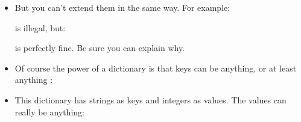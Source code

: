 \documentclass[letterpaper,10pt,english]{sphinxmanual}
\begin{document}
\begin{itemize}
\item {} 
But you can’t extend them in the same way. For example:

\begin{sphinxVerbatim}[commandchars=\\\{\}]
\PYG{p}{[}\PYG{p}{]}  
\end{sphinxVerbatim}

is illegal, but:

\begin{sphinxVerbatim}[commandchars=\\\{\}]
\PYG{p}{[}\PYG{p}{]}  
\end{sphinxVerbatim}

is perfectly fine. Be sure you can explain why.

\item {} 
Of course the power of a dictionary is that keys can be anything, or at least anything
:

\begin{sphinxVerbatim}[commandchars=\\\{\}]
   
\PYG{p}{[}\PYG{p}{]}
\end{sphinxVerbatim}

\item {} 
This dictionary has strings as keys and integers as values.
The values can really be anything:

\begin{sphinxVerbatim}[commandchars=\\\{\}]
   \PYG{p}{[} \PYG{p}{]}  \PYG{p}{[}\PYG{p}{]}
\PYG{p}{[}\PYG{p}{]}
\end{sphinxVerbatim}


\end{itemize}
\end{document}
